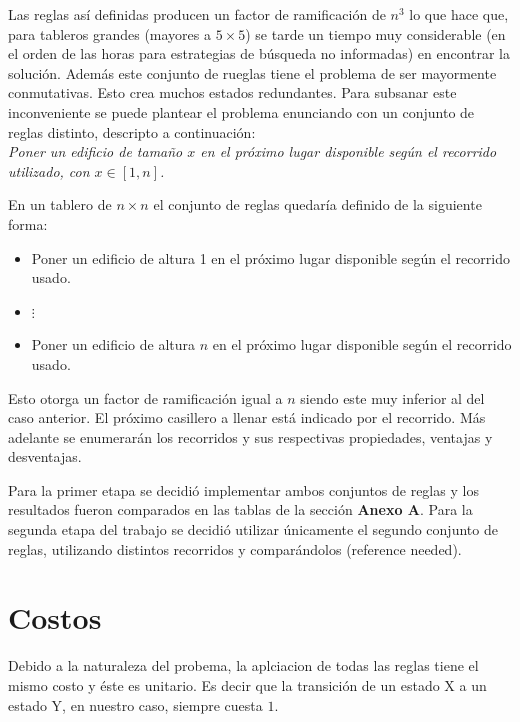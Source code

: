 \documentclass[%
    final,
    reprint,
    notitlepage,
    narroweqnarray,
    inline,
    twoside,
    invited
    ]{ieee}
\begin{document}
\par Las reglas así definidas producen un factor de ramificación de $n^3$ lo que hace que, para tableros grandes (mayores a $5\times5$) se 
tarde un tiempo muy considerable (en el orden de las horas para estrategias de búsqueda no informadas) en encontrar la solución. Además este conjunto de rueglas tiene el problema 
de ser mayormente conmutativas. Esto crea muchos estados redundantes. 
Para subsanar este inconveniente se puede plantear el problema enunciando con un conjunto de reglas distinto, descripto a continuación:\\

\emph{Poner un edificio de tamaño $x$ en el próximo lugar disponible según el recorrido utilizado, con $x \in [1, n]$.}\\

\par En un tablero de $n\times n$ el conjunto de reglas quedaría definido de la siguiente forma:\\

\begin{itemize}
\item Poner un edificio de altura 1 en el próximo lugar disponible según el recorrido usado.
\item $\vdots$
\item Poner un edificio de altura $n$ en el próximo lugar disponible según el recorrido usado.
\end{itemize}

\par Esto otorga un factor de ramificación igual a $n$ siendo este muy inferior al del caso anterior. El próximo casillero a llenar está indicado por 
el recorrido. Más adelante se enumerarán los recorridos y sus respectivas propiedades, ventajas y desventajas. \\
\par Para la primer etapa se decidió implementar ambos conjuntos de reglas y los resultados fueron comparados en las tablas de la sección \textbf{Anexo A}. 
Para la segunda etapa del trabajo se decidió utilizar únicamente el segundo conjunto de reglas, utilizando distintos recorridos y comparándolos (reference needed). 

\section{Costos}

\par Debido a la naturaleza del probema, la aplciacion de todas las reglas tiene el mismo costo y éste es unitario. Es decir que la transición de un estado X a un estado Y, en nuestro caso, siempre cuesta $1$.
\end{document}
